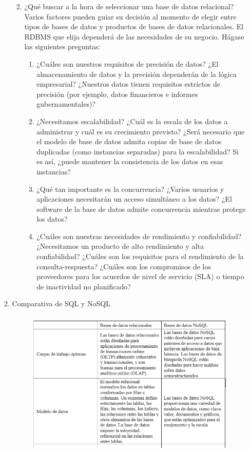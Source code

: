 \documentclass[12pt,a4paper,oneside]{book}
\begin{document}
\begin{enumerate}
\begin{enumerate}
\begin{enumerate}
\begin{enumerate}
				\end{enumerate}
			\item ¿Qué buscar a la hora de seleccionar una base de datos relacional?\\
			
			Varios factores pueden guiar su decisión al momento de elegir entre tipos de bases de datos y productos de bases de datos relacionales. El RDBMS que elija dependerá de las necesidades de su negocio. Hágase las siguientes preguntas:\\
			
				\begin{enumerate}
					\item ¿Cuáles son nuestros requisitos de precisión de datos? ¿El almacenamiento de datos y la precisión dependerán de la lógica empresarial? ¿Nuestros datos tienen requisitos estrictos de precisión (por ejemplo, datos financieros e informes gubernamentales)?
					\item ¿Necesitamos escalabilidad? ¿Cuál es la escala de los datos a administrar y cuál es su crecimiento previsto? ¿Será necesario que el modelo de base de datos admita copias de base de datos duplicadas (como instancias separadas) para la escalabilidad? Si es así, ¿puede mantener la consistencia de los datos en esas instancias?
					\item ¿Qué tan importante es la concurrencia? ¿Varios usuarios y aplicaciones necesitarán un acceso simultáneo a los datos? ¿El software de la base de datos admite concurrencia mientras protege los datos?
					\item ¿Cuáles son nuestras necesidades de rendimiento y confiabilidad? ¿Necesitamos un producto de alto rendimiento y alta confiabilidad? ¿Cuáles son los requisitos para el rendimiento de la consulta-respuesta? ¿Cuáles son los compromisos de los proveedores para los acuerdos de nivel de servicio (SLA) o tiempo de inactividad no planificado?
					
				\end{enumerate}
		\end{enumerate}
		
		\item Comparativa de SQL y NoSQL
		
		\begin{figure}[htb]
			\centering \includegraphics[width=12cm, height=7cm]{img/NoSQL/4.1.jpg}
		\end{figure}
	

\end{enumerate}
\end{enumerate}
\end{document}
